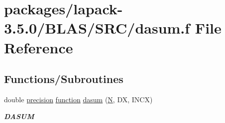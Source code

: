 \hypertarget{lapack-3_85_80_2BLAS_2SRC_2dasum_8f}{}\section{packages/lapack-\/3.5.0/\+B\+L\+A\+S/\+S\+R\+C/dasum.f File Reference}
\label{lapack-3_85_80_2BLAS_2SRC_2dasum_8f}
\subsection*{Functions/\+Subroutines}
\begin{DoxyCompactItemize}
\item 
double \hyperlink{numinquire_8h_a2c8e616467665d0b2814d4c1589ba74e}{precision} \hyperlink{afunc_8m_a7b5e596df91eadea6c537c0825e894a7}{function} \hyperlink{group__double__blas__level1_ga7372361a44de0649813750b3280c58cc}{dasum} (\hyperlink{polmisc_8c_a0240ac851181b84ac374872dc5434ee4}{N}, D\+X, I\+N\+C\+X)
\begin{DoxyCompactList}\small\item\em {\bfseries D\+A\+S\+U\+M} \end{DoxyCompactList}\end{DoxyCompactItemize}
